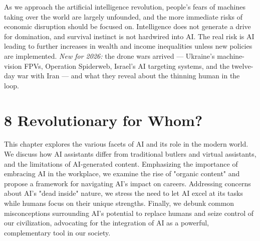 As we approach the artificial intelligence revolution, people’s fears of machines taking over the world are largely unfounded, and the more immediate risks of economic disruption should be focused on. Intelligence does not generate a drive for domination, and survival instinct is not hardwired into AI. The real risk is AI leading to further increases in wealth and income inequalities unless new policies are implemented. \textit{New for 2026:} the drone wars arrived --- Ukraine's machine-vision FPVs, Operation Spiderweb, Israel's AI targeting systems, and the twelve-day war with Iran --- and what they reveal about the thinning human in the loop.

\section*{8 Revolutionary for Whom?}

This chapter explores the various facets of AI and its role in the modern world. We discuss how AI assistants differ from traditional butlers and virtual assistants, and the limitations of AI-generated content. Emphasizing the importance of embracing AI in the workplace, we examine the rise of "organic content" and propose a framework for navigating AI’s impact on careers. Addressing concerns about AI’s "dead inside" nature, we stress the need to let AI excel at its tasks while humans focus on their unique strengths. Finally, we debunk common misconceptions surrounding AI’s potential to replace humans and seize control of our civilization, advocating for the integration of AI as a powerful, complementary tool in our society.
